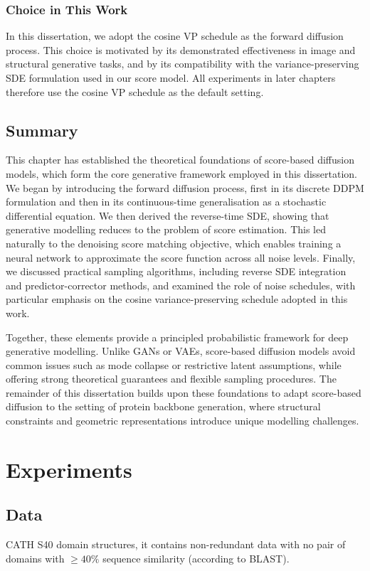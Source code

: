 \documentclass[a4paper,12pt]{article}
\begin{document}
\subsubsection*{Choice in This Work}
In this dissertation, we adopt the cosine VP schedule as the forward diffusion process. This choice is motivated by its demonstrated effectiveness in image and structural generative tasks, and by its compatibility with the variance-preserving SDE formulation used in our score model. All experiments in later chapters therefore use the cosine VP schedule as the default setting.

\subsection{Summary}
This chapter has established the theoretical foundations of score-based diffusion models, which form the core generative framework employed in this dissertation. We began by introducing the forward diffusion process, first in its discrete DDPM formulation and then in its continuous-time generalisation as a stochastic differential equation. We then derived the reverse-time SDE, showing that generative modelling reduces to the problem of score estimation. This led naturally to the denoising score matching objective, which enables training a neural network to approximate the score function across all noise levels. Finally, we discussed practical sampling algorithms, including reverse SDE integration and predictor-corrector methods, and examined the role of noise schedules, with particular emphasis on the cosine variance-preserving schedule adopted in this work.

Together, these elements provide a principled probabilistic framework for deep generative modelling. Unlike GANs or VAEs, score-based diffusion models avoid common issues such as mode collapse or restrictive latent assumptions, while offering strong theoretical guarantees and flexible sampling procedures. The remainder of this dissertation builds upon these foundations to adapt score-based diffusion to the setting of protein backbone generation, where structural constraints and geometric representations introduce unique modelling challenges.

\section{Experiments}\label{sec:Experiments}
\subsection{Data}
CATH S40 domain structures, it contains non-redundant data with no pair of domains with \(\geq 40\%\) sequence similarity (according to BLAST).
\end{document}
